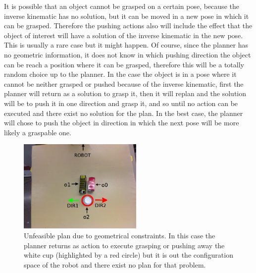 It is possible that an object cannot be grasped on a certain pose, because the inverse kinematic has no solution, but it can be moved in a new pose in which it can be grasped. Therefore the pushing actions also will include the effect that the object of interest will have a solution of the inverse kinematic in the new pose. This is usually a rare case but it might happen. Of course, since the planner has no geometric information, it does not know in which pushing direction the object can be reach a position where it can be grasped, therefore this will be a totally random choice up to the planner. In the case the object is in a pose where it cannot be neither grasped or pushed because of the inverse kinematic, first the planner will return as a solution to grasp it, then it will replan and the solution will be to push it in one direction and grasp it, and so until no action can be executed and there exist no solution for the plan. In the best case, the planner will chose to push the object in direction in which the next pose will be more likely a graspable one. 

\begin{figure}[tb]
\centering
\includegraphics[width=6cm]{Img/backtracking/image4.png}
\caption{Unfeasible plan due to geometrical constraints. In this case the planner returns as action to execute grasping or pushing away the white cup (highlighted by a red circle) but it is out the configuration space of the robot and there exist no plan for that problem.} \label{fig:backtracking1}
\end{figure}

